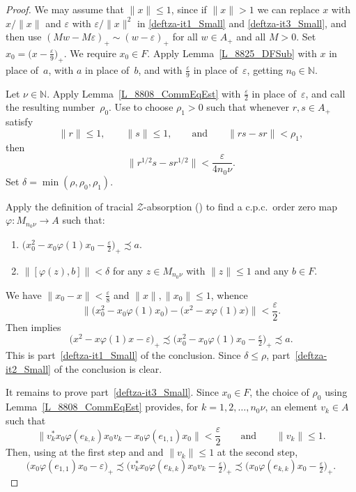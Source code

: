 \documentclass[11pt]{amsart}
\theoremstyle{plain}
\theoremstyle{definition}
\theoremstyle{remark}
\numberwithin{equation}{section}
\newcommand{\N}{\mathbb{N}}
\newcommand{\dt}{\delta}
\newcommand{\ep}{\varepsilon}
\newcommand{\ph}{\varphi}
\newcommand{\rh}{\rho}
\newcommand{\andeqn}{\qquad {\mbox{and}} \qquad}
\begin{document}
\begin{proof}
We may assume that $\|x\|\leq 1$, since if $\|x\|>1$ we can replace $x$ with
$x/\|x\|$ and $\varepsilon$ with $\varepsilon/\|x\|^2$ in \eqref{deftza-it1_Small}
and \eqref{deftza-it3_Small}, and then use
$(Mw-M\varepsilon)_+ \sim (w-\varepsilon)_+$ for all $w\in A_+$ and all $M>0$.
Set $x_0 = \bigl( x - \frac{\ep}{9} \bigr)_{+}$.
We require $x_0 \in F$.
Apply Lemma~\ref{L_8825_DFSub}
with $x$ in place of~$a$,
with $a$ in place of~$b$,
and with $\frac{\ep}{9}$ in place of~$\ep$,
getting $n_0 \in \N$.

Let $\nu \in \N$.
Apply Lemma~\ref{L_8808_CommEqEst}
with $\frac{\ep}{2}$ in place of~$\ep$,
and call the resulting number~$\rh_0$.
Use \cite[Lemma 2.5]{AP16} to choose $\rh_1 > 0$
such that whenever
$r, s \in A_{+}$
satisfy
\[
\| r \| \leq 1,
\qquad
\| s \| \leq 1,
\qquad {\mbox{and}} \qquad
\| r s - s r \| < \rh_1 ,
\]
then
\[
\bigl\| r^{1/2} s - s r^{1/2} \bigr\| < \frac{\ep}{4 n_0 \nu}.
\]
Set $\dt = \min (\rh, \rh_0, \rh_1)$.


Apply the definition of tracial $\mathcal{Z}$-absorption
(\cite[Definition~3.6]{AGJP21})
to find a c.p.c.~order zero map $\varphi \colon M_{n_0 \nu} \to A$
such that:
%
\begin{enumerate}
%
\item\label{8808_Use_deftza-it1}
$\bigl( x_0^{2} - x_0 \varphi (1) x_0
    - \tfrac{\varepsilon}{2} \bigr)_{+} \precsim a$.
%
\item\label{8808_Use_deftza-it2}
$\| [\varphi (z), b] \| < \dt$
for any $z \in M_{n_0 \nu}$ with $\| z \| \leq 1$
and any $b \in F  $.
\end{enumerate}
%

We have $\| x_0 - x \| < \frac{\ep}{8}$ and $\|x\|,\|x_0\|\leq 1$,
whence
\[
\bigl\| \bigl( x_0^2 - x_0 \ph (1) x_0 \bigr)
   - \bigl( x^2 - x \ph (1) x \bigr) \bigr\| < \frac{\ep}{2}.
\]
Then \cite[Corollary~1.6]{Ph14} implies
\[
\bigl( x^2 - x \ph (1) x - \ep \bigr)_{+}
 \precsim \bigl( x_0^2 - x_0 \ph (1) x_0 - \tfrac{\ep}{2} \bigr)_{+}
 \precsim a.
\]
This is part~\eqref{deftza-it1_Small}
of the conclusion.
Since $\dt \leq \rh$,
part~\eqref{deftza-it2_Small}
of the conclusion is clear.

It remains to prove part~\eqref{deftza-it3_Small}.
Since $x_0 \in F$,
the choice of $\rh_0$ using Lemma~\ref{L_8808_CommEqEst}
provides, for $k = 1, 2, \ldots, n_0 \nu$,
an element $v_k \in A$ such that
\[
\bigl\| v_k^* x_0 \ph (e_{k, k}) x_0 v_k
   - x_0 \ph (e_{1, 1}) x_0 \bigr\| < \frac{\ep}{2}
\andeqn
\| v_k \| \leq 1.
\]
Then, using \cite[Corollary~1.6]{Ph14} at the first step and
\cite[Lemma~2.3]{AGJP21} and $\| v_k \| \leq 1$ at the second step,
%
\begin{equation}\label{Eq_8808_HalfEst}
\bigl( x_0 \ph (e_{1, 1}) x_0 - \ep \bigr)_{+}
  \precsim \bigl( v_k^* x_0 \ph (e_{k, k}) x_0 v_k
      - \tfrac{\ep}{2} \bigr)_{+}
  \precsim \bigl( x_0 \ph (e_{k, k}) x_0
      - \tfrac{\ep}{2} \bigr)_{+}.
\end{equation}
%


\end{proof}
\end{document}
